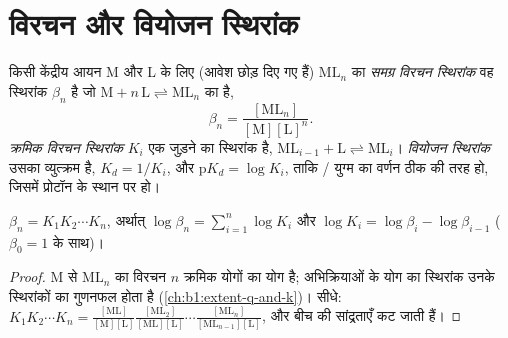 \section{विरचन और वियोजन स्थिरांक}

\begin{definition}[विरचन और वियोजन स्थिरांक]\label{def:b1:complexation:formation-constant}
किसी केंद्रीय आयन M और  L के लिए (आवेश छोड़ दिए गए हैं)
$\mathrm{ML}_n$ का \emph{समग्र
विरचन स्थिरांक} वह स्थिरांक $\beta_n$ है जो
$\mathrm{M} + n\,\mathrm{L} \rightleftharpoons \mathrm{ML}_n$ का है,
\[
  \beta_n = \frac{[\mathrm{ML}_n]}{[\mathrm{M}][\mathrm{L}]^n} .
\]
\emph{क्रमिक विरचन स्थिरांक}
$K_i$ एक  जुड़ने का स्थिरांक है,
$\mathrm{ML}_{i-1} + \mathrm{L} \rightleftharpoons \mathrm{ML}_i$।
\emph{वियोजन स्थिरांक}
उसका व्युत्क्रम है, $K_d = 1/K_i$, और $\mathrm{p}K_d = \log K_i$, ताकि
/ युग्म का वर्णन ठीक  की तरह हो,
जिसमें प्रोटॉन के स्थान पर  हो।
\end{definition}

\begin{proposition}[समग्र और क्रमिक स्थिरांक]\label{prop:b1:complexation:beta-k}
$\beta_n = K_1 K_2 \cdots K_n$, अर्थात्
$\log\beta_n = \sum_{i=1}^n \log K_i$ और $\log K_i = \log\beta_i -
\log\beta_{i-1}$ ($\beta_0 = 1$ के साथ)।
\end{proposition}

\begin{proof}
M से $\mathrm{ML}_n$ का विरचन $n$ क्रमिक
योगों का योग है; अभिक्रियाओं के योग का स्थिरांक उनके
स्थिरांकों का गुणनफल होता है (\cref{ch:b1:extent-q-and-k})। सीधे:
$K_1 K_2\cdots K_n = \frac{[\mathrm{ML}]}{[\mathrm{M}][\mathrm{L}]}
\frac{[\mathrm{ML_2}]}{[\mathrm{ML}][\mathrm{L}]}\cdots
\frac{[\mathrm{ML}_n]}{[\mathrm{ML}_{n-1}][\mathrm{L}]}$, और
बीच की सांद्रताएँ कट जाती हैं।
\end{proof}

